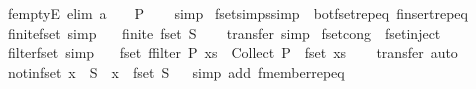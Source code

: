 \begin{isabellebody}
\ femptyE\ {\isacharbrackleft}elim{\isacharbang}{\isacharbrackright}{\isacharcolon}\ {\isachardoublequoteopen}a\ {\isacharbar}{\isasymin}{\isacharbar}\ {\isacharbraceleft}{\isacharbar}{\isacharbar}{\isacharbraceright}\ {\isasymLongrightarrow}\ P{\isachardoublequoteclose}\isanewline
%
\isadelimproof
\ \ %
\endisadelimproof
%
\isatagproof
{}\isamarkupfalse%
\ simp%
\endisatagproof
{\isafoldproof}%
%
\isadelimproof
%
\endisadelimproof
%
\isadelimdocument
%
\endisadelimdocument
%
\isatagdocument
%
\isamarkuptrue%
%
\endisatagdocument
{\isafolddocument}%
%
\isadelimdocument
%
\endisadelimdocument
{}\isamarkupfalse%
\ fset{\isacharunderscore}simps{\isacharbrackleft}simp{\isacharbrackright}\ {\isacharequal}\ bot{\isacharunderscore}fset{\isachardot}rep{\isacharunderscore}eq\ finsert{\isachardot}rep{\isacharunderscore}eq\isanewline
\isanewline
{}\isamarkupfalse%
\ finite{\isacharunderscore}fset\ {\isacharbrackleft}simp{\isacharbrackright}{\isacharcolon}\isanewline
\ \ \ {\isachardoublequoteopen}finite\ {\isacharparenleft}fset\ S{\isacharparenright}{\isachardoublequoteclose}\isanewline
%
\isadelimproof
\ \ %
\endisadelimproof
%
\isatagproof
{}\isamarkupfalse%
\ transfer\ simp%
\endisatagproof
{\isafoldproof}%
%
\isadelimproof
\isanewline
%
\endisadelimproof
\isanewline
{}\isamarkupfalse%
\ fset{\isacharunderscore}cong\ {\isacharequal}\ fset{\isacharunderscore}inject\isanewline
\isanewline
{}\isamarkupfalse%
\ filter{\isacharunderscore}fset\ {\isacharbrackleft}simp{\isacharbrackright}{\isacharcolon}\isanewline
\ \ \ {\isachardoublequoteopen}fset\ {\isacharparenleft}ffilter\ P\ xs{\isacharparenright}\ {\isacharequal}\ Collect\ P\ {\isasyminter}\ fset\ xs{\isachardoublequoteclose}\isanewline
%
\isadelimproof
\ \ %
\endisadelimproof
%
\isatagproof
{}\isamarkupfalse%
\ transfer\ auto%
\endisatagproof
{\isafoldproof}%
%
\isadelimproof
\isanewline
%
\endisadelimproof
\isanewline
{}\isamarkupfalse%
\ notin{\isacharunderscore}fset{\isacharcolon}\ {\isachardoublequoteopen}x\ {\isacharbar}{\isasymnotin}{\isacharbar}\ S\ {\isasymlongleftrightarrow}\ x\ {\isasymnotin}\ fset\ S{\isachardoublequoteclose}%
\isadelimproof
\ %
\endisadelimproof
%
\isatagproof
{}\isamarkupfalse%
\ {\isacharparenleft}simp\ add{\isacharcolon}\ fmember{\isachardot}rep{\isacharunderscore}eq{\isacharparenright}%
\endisatagproof
{\isafoldproof}%
%
\isadelimproof
%
\endisadelimproof
\isanewline
\isanewline

\end{isabellebody}
